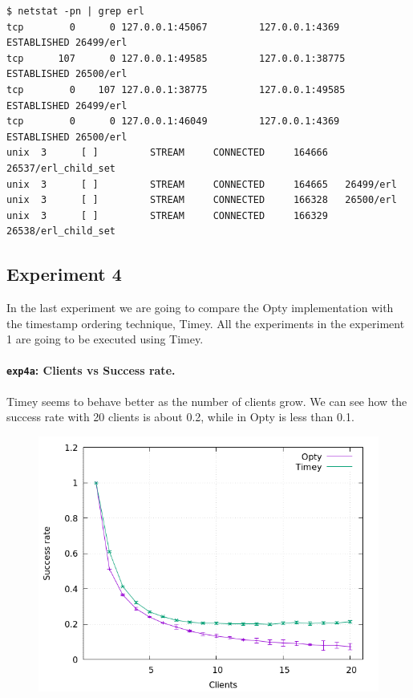 \documentclass[a4paper, 11pt]{article}
\begin{document}
\begin{Verbatim}[fontsize=\scriptsize]
$ netstat -pn | grep erl
tcp        0      0 127.0.0.1:45067         127.0.0.1:4369          ESTABLISHED 26499/erl
tcp      107      0 127.0.0.1:49585         127.0.0.1:38775         ESTABLISHED 26500/erl
tcp        0    107 127.0.0.1:38775         127.0.0.1:49585         ESTABLISHED 26499/erl
tcp        0      0 127.0.0.1:46049         127.0.0.1:4369          ESTABLISHED 26500/erl
unix  3      [ ]         STREAM     CONNECTED     164666   26537/erl_child_set
unix  3      [ ]         STREAM     CONNECTED     164665   26499/erl
unix  3      [ ]         STREAM     CONNECTED     166328   26500/erl
unix  3      [ ]         STREAM     CONNECTED     166329   26538/erl_child_set
\end{Verbatim}

\subsection{Experiment 4}

In the last experiment we are going to compare the Opty implementation with the 
timestamp ordering technique, Timey. All the experiments in the experiment 1 are 
going to be executed using Timey.

\paragraph{\texttt{exp4a}: Clients vs Success rate.}

Timey seems to behave better as the number of clients grow. We can see how the 
success rate with 20 clients is about 0.2, while in Opty is less than 0.1.

\begin{figure}[H]
\centering
\includegraphics[width=.8\linewidth]{exp4/a/fig.png}
\end{figure}
\end{document}
